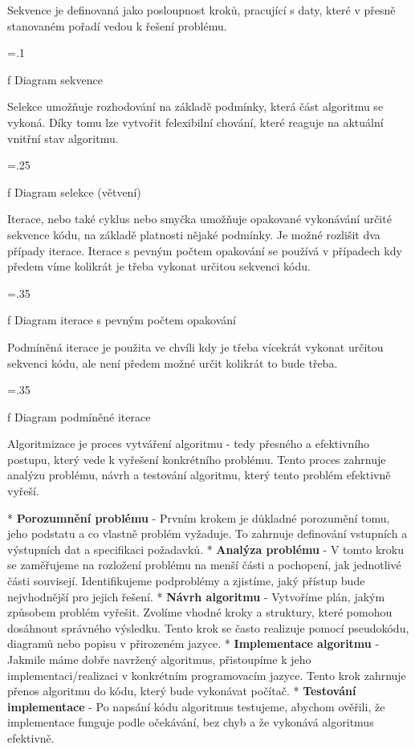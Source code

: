 Sekvence je definovaná jako posloupnost kroků, pracující s daty, které v přesně stanovaném pořadí vedou k řešení problému.

\vskip 5mm
\picw=.1\hsize \centerline{ }\nobreak\medskip
\caption/f Diagram sekvence

Selekce umožňuje rozhodování na základě podmínky, která část algoritmu se vykoná. Díky tomu lze vytvořit felexibilní chování, které reaguje na aktuální vnitřní stav algoritmu. 

\vskip 5mm
\picw=.25\hsize \centerline{ }\nobreak\medskip
\caption/f Diagram selekce (větvení)

Iterace, nebo také cyklus nebo smyčka umožňuje opakované vykonávání určité sekvence kódu, na základě platnosti nějaké podmínky. Je možné rozlišit dva případy iterace. Iterace s pevným počtem opakování se používá v případech kdy předem víme kolikrát je třeba vykonat určitou sekvenci kódu. 

\vskip 5mm
\picw=.35\hsize \centerline{ }\nobreak\medskip
\caption/f Diagram iterace s pevným počtem opakování

Podmíněná iterace je použita ve chvíli kdy je třeba vícekrát vykonat určitou sekvenci kódu, ale není předem možné určit kolikrát to bude třeba.

\vskip 5mm
\picw=.35\hsize \centerline{ }\nobreak\medskip
\caption/f Diagram podmíněné iterace

Algoritmizace je proces vytváření algoritmu - tedy přesného a efektivního postupu, který vede k vyřešení konkrétního problému. Tento proces zahrnuje analýzu problému, návrh a testování algoritmu, který tento problém efektivně vyřeší. 

\begitems
* {\bf Porozumnění problému} - Prvním krokem je důkladné porozumění tomu, jeho podstatu a co vlastně problém vyžaduje. To zahrnuje definování vstupních a výstupních dat a specifikaci požadavků.
* {\bf Analýza problému} - V tomto kroku se zaměřujeme na rozložení problému na menší části a pochopení, jak jednotlivé části souvisejí. Identifikujeme podproblémy a zjistíme, jaký přístup bude nejvhodnější pro jejich řešení.
* {\bf Návrh algoritmu} - Vytvoříme plán, jakým způsobem problém vyřešit. Zvolíme vhodné kroky a struktury, které pomohou dosáhnout správného výsledku. Tento krok se často realizuje pomocí pseudokódu, diagramů nebo popisu v přirozeném jazyce.
* {\bf Implementace algoritmu} - Jakmile máme dobře navržený algoritmus, přistoupíme k jeho implementaci/realizaci v konkrétním programovacím jazyce. Tento krok zahrnuje přenos algoritmu do kódu, který bude vykonávat počítač.
* {\bf Testování implementace} - Po napsání kódu algoritmus testujeme, abychom ověřili, že implementace funguje podle očekávání, bez chyb a že vykonává algoritmus efektivně.
\enditems

